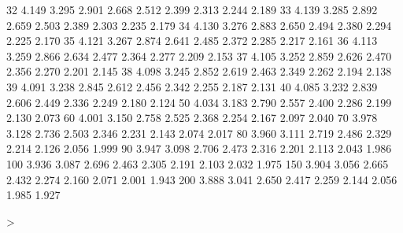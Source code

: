 \documentclass[onecolumn,12pt]{book}
\begin{document}
\begin{Schunk}
\begin{Soutput}
32    4.149   3.295   2.901   2.668   2.512   2.399   2.313   2.244   2.189
33    4.139   3.285   2.892   2.659   2.503   2.389   2.303   2.235   2.179
34    4.130   3.276   2.883   2.650   2.494   2.380   2.294   2.225   2.170
35    4.121   3.267   2.874   2.641   2.485   2.372   2.285   2.217   2.161
36    4.113   3.259   2.866   2.634   2.477   2.364   2.277   2.209   2.153
37    4.105   3.252   2.859   2.626   2.470   2.356   2.270   2.201   2.145
38    4.098   3.245   2.852   2.619   2.463   2.349   2.262   2.194   2.138
39    4.091   3.238   2.845   2.612   2.456   2.342   2.255   2.187   2.131
40    4.085   3.232   2.839   2.606   2.449   2.336   2.249   2.180   2.124
50    4.034   3.183   2.790   2.557   2.400   2.286   2.199   2.130   2.073
60    4.001   3.150   2.758   2.525   2.368   2.254   2.167   2.097   2.040
70    3.978   3.128   2.736   2.503   2.346   2.231   2.143   2.074   2.017
80    3.960   3.111   2.719   2.486   2.329   2.214   2.126   2.056   1.999
90    3.947   3.098   2.706   2.473   2.316   2.201   2.113   2.043   1.986
100   3.936   3.087   2.696   2.463   2.305   2.191   2.103   2.032   1.975
150   3.904   3.056   2.665   2.432   2.274   2.160   2.071   2.001   1.943
200   3.888   3.041   2.650   2.417   2.259   2.144   2.056   1.985   1.927
\end{Soutput}
\begin{Sinput}
> 
\end{Sinput}
\end{Schunk}
 \vfill
\eject
\end{document}
